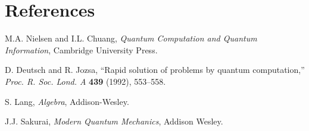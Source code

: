 \documentclass[11pt,oneside]{book}
\theoremstyle{remark}
\begin{document}
	\chapter{References}
	
	\begin{enumerate}[label={[\arabic*]}]
		\item M.A. Nielsen and I.L. Chuang, \emph{Quantum Computation and Quantum Information}, Cambridge University Press.
		\item D. Deutsch and R. Jozsa, ``Rapid solution of problems by quantum computation,'' \emph{Proc. R. Soc. Lond. A} \textbf{439} (1992), 553--558.
		\item S. Lang, \emph{Algebra}, Addison-Wesley.
		\item J.J. Sakurai, \emph{Modern Quantum Mechanics}, Addison Wesley.
	\end{enumerate}
	
	\backmatter
	
\end{document}
